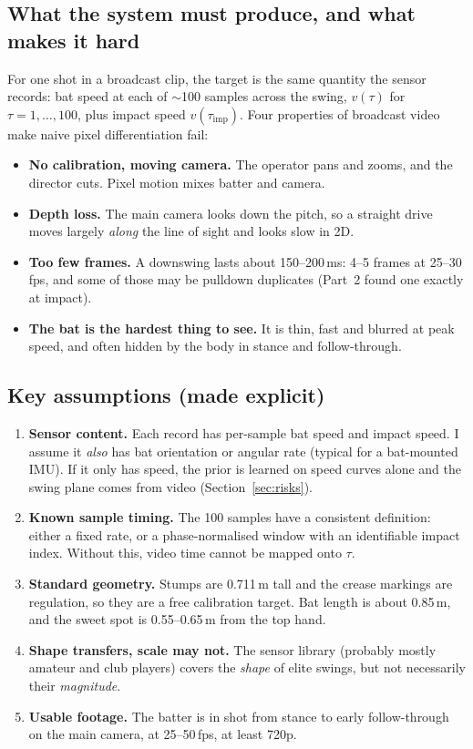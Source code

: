 \documentclass[11pt,a4paper]{article}
\begin{document}
\subsection{What the system must produce, and what makes it hard}
For one shot in a broadcast clip, the target is the same quantity the sensor records: bat speed at each of $\sim$100 samples across the swing,
$v(\tau)$ for $\tau=1,\dots,100$, plus impact speed $v(\tau_{\text{imp}})$. Four properties of broadcast video make naive pixel differentiation fail:
\begin{itemize}
  \item \textbf{No calibration, moving camera.} The operator pans and zooms, and the director cuts. Pixel motion mixes batter and camera.
  \item \textbf{Depth loss.} The main camera looks down the pitch, so a straight drive moves largely \emph{along} the line of sight and looks slow in 2D.
  \item \textbf{Too few frames.} A downswing lasts about 150--200\,ms: 4--5 frames at 25--30\,fps, and some of those may be pulldown duplicates (Part~2 found one exactly at impact).
  \item \textbf{The bat is the hardest thing to see.} It is thin, fast and blurred at peak speed, and often hidden by the body in stance and follow-through.
\end{itemize}

\subsection{Key assumptions (made explicit)}
\begin{enumerate}[label=\textbf{A\arabic*}]
  \item \textbf{Sensor content.} Each record has per-sample bat speed and impact speed. I assume it \emph{also} has bat orientation or angular rate (typical for a bat-mounted IMU). If it only has speed, the prior is learned on speed curves alone and the swing plane comes from video (Section~\ref{sec:risks}).
  \item \textbf{Known sample timing.} The 100 samples have a consistent definition: either a fixed rate, or a phase-normalised window with an identifiable impact index. Without this, video time cannot be mapped onto $\tau$.
  \item \textbf{Standard geometry.} Stumps are 0.711\,m tall and the crease markings are regulation, so they are a free calibration target. Bat length is about 0.85\,m, and the sweet spot is 0.55--0.65\,m from the top hand.
  \item \textbf{Shape transfers, scale may not.} The sensor library (probably mostly amateur and club players) covers the \emph{shape} of elite swings, but not necessarily their \emph{magnitude}.
  \item \textbf{Usable footage.} The batter is in shot from stance to early follow-through on the main camera, at 25--50\,fps, at least 720p.
\end{enumerate}
\end{document}
